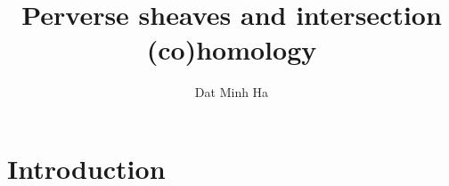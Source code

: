 

\setcounter{section}{-1}





    \title{Perverse sheaves and intersection (co)homology}
    
    \author{Dat Minh Ha}
    \maketitle
    
    \begin{abstract}
        
    \end{abstract}
    
    {
      \hypersetup{} 
      \tableofcontents %
    }

    \section{Introduction}

    
    
    \printbibliography

